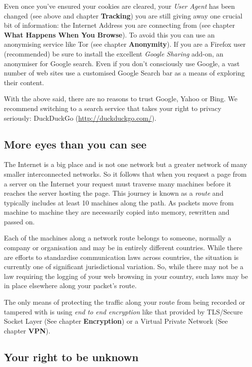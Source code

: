 Even once you've ensured your cookies are cleared, your \emph{User
Agent} has been changed (see above and chapter \textbf{Tracking}) you
are still giving away one crucial bit of information: the Internet
Address you are connecting from (see chapter \textbf{What Happens When
You Browse}). To avoid this you can use an anonymising service like Tor
(see chapter \textbf{Anonymity}). If you are a Firefox user
(recommended) be sure to install the excellent \emph{Google Sharing}
add-on, an anonymiser for Google search. Even if you don't consciously
use Google, a vast number of web sites use a customised Google Search
bar as a means of exploring their content.

With the above said, there are no reasons to trust Google, Yahoo or
Bing. We recommend switching to a search service that takes your right
to privacy seriously: DuckDuckGo
(\href{http://duckduckgo.com/}{http://duckduckgo.com/}).

\subsection{More eyes than you can see}

The Internet is a big place and is not one network but a greater network
of many smaller interconnected networks. So it follows that when you
request a page from a server on the Internet your request must traverse
many machines before it reaches the server hosting the page. This
journey is known as a \emph{route} and typically includes at least 10
machines along the path. As packets move from machine to machine they
are necessarily copied into memory, rewritten and passed on.

Each of the machines along a network route belongs to someone, normally
a company or organisation and may be in entirely different countries.
While there are efforts to standardise communication laws across
countries, the situation is currently one of significant jurisdictional
variation. So, while there may not be a law requiring the logging of
your web browsing in your country, such laws may be in place elsewhere
along your packet's route.

The only means of protecting the traffic along your route from being
recorded or tampered with is using \emph{end to end encryption} like
that provided by TLS/Secure Socket Layer (See chapter
\textbf{Encryption}) or a Virtual Private Network (See chapter
\textbf{VPN}).

\subsection{Your right to be unknown}

